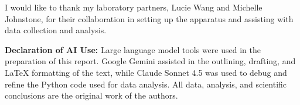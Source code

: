 I would like to thank my laboratory partners, Lucie Wang and Michelle
Johnstone, for their collaboration in setting up the apparatus and assisting
with data collection and analysis.

\textbf{Declaration of AI Use:} Large language model tools were used in the
preparation of this report.
Google Gemini assisted in the outlining, drafting, and LaTeX formatting of the
text, while Claude Sonnet 4.5 was used to debug and refine the Python code
used for data analysis.
All data, analysis, and scientific conclusions are the original work of the
authors.